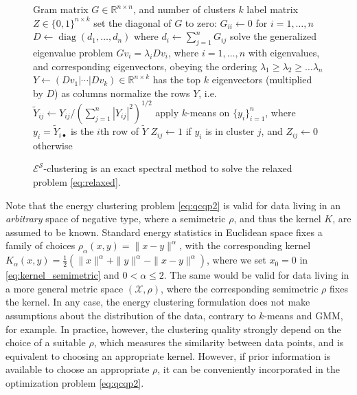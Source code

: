 \documentclass[aps,preprint,nofootinbib,floatfix]{revtex4-1}
\DeclareMathOperator{\diag}{diag}
\newcommand\kk{K}
\begin{document}
\begin{figure}
\begin{flushleft}
\begin{algorithm}[H]
\vspace{.5em}
\begin{algorithmic}[1]
\INPUT Gram matrix $G\in\mathbb{R}^{n\times n}$, and number of clusters $k$
\OUTPUT label matrix $Z \in \{ 0, 1\}^{n \times k}$
\STATE set the diagonal of $G$ to zero: $G_{ii} \leftarrow 0$ 
        for $i=1,\dotsc,n$
\STATE $D\leftarrow\diag(d_1,\dotsc,d_n)$ 
        where $d_i \leftarrow \sum_{j=1}^n G_{ij}$
\STATE solve the generalized eigenvalue problem $G v_i = \lambda_i D v_i$,
        where $i=1,\dotsc,n$ with eigenvalues, and corresponding eigenvectors,
        obeying the ordering
        $\lambda_1 \ge \lambda_2 \ge \dotsc \lambda_n$
\STATE $Y \leftarrow (D v_1| \dotsm | D v_k) 
        \in \mathbb{R}^{n\times k}$ 
has the top $k$ eigenvectors (multiplied by $D$) as columns
\STATE normalize the rows $Y$, i.e. 
$\widetilde{Y}_{ij} \leftarrow Y_{ij} \Big/ 
\left(\sum_{j=1}^n |Y_{ij}|^2\right)^{1/2}$
\STATE apply $k$-means on $\{ y_i \}_{i=1}^n$, 
where $y_i = \widetilde{Y}_{i\bullet}$
is the $i$th row of $\widetilde{Y}$
\STATE $Z_{ij} \leftarrow 1$ if $y_i$ is in cluster $j$, 
        and $Z_{ij} \leftarrow 0$ otherwise
\end{algorithmic}
\caption{
\label{spectralalgo}
$\mathcal{E^S}$-clustering is an exact spectral method to solve
the relaxed problem \eqref{eq:relaxed}.
\hspace{\fill}
}
\end{algorithm}
\end{flushleft}
\end{figure}

Note that the energy clustering problem \eqref{eq:qcqp2} 
is valid for data living in an \emph{arbitrary} space of negative type, where
a semimetric $\rho$, and thus the kernel $\kk$, are
assumed to be known. Standard energy statistics in
Euclidean space fixes a family of choices 
$\rho_\alpha(x,y) = \| x - y\|^\alpha$, with the corresponding
kernel $K_\alpha(x,y) = \tfrac{1}{2} \left( \| x \|^\alpha + \| y \|^\alpha - 
\| x-y\|^\alpha \right)$, where we
set $x_0=0$ in \eqref{eq:kernel_semimetric} and  $0<\alpha\le 2$.
The same would be valid for data living in a more general
metric space $(\mathcal{X}, \rho)$, where the corresponding semimetric $\rho$ 
fixes the kernel.
In any case, the energy  clustering 
formulation does not make assumptions
about  the distribution of the data, 
contrary to $k$-means and GMM, for example.
In practice, however,
the clustering quality strongly depend on the choice of a suitable
$\rho$, which measures the similarity between data points,
and is equivalent to choosing an appropriate kernel.
However, if prior information is available to choose an appropriate $\rho$,
it can be conveniently incorporated in the 
optimization problem \eqref{eq:qcqp2}.
\end{document}
